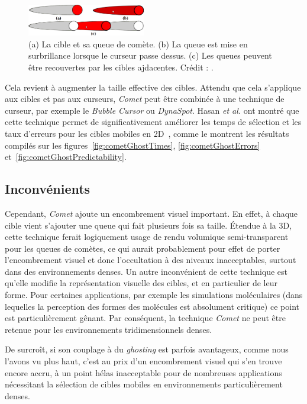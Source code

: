 	\begin{figure} %
		\centering
		\includegraphics[width=0.46\textwidth]{figures/ch2/comet}
		\caption[La technique \emph{Comet}]{(a) La cible et sa queue de comète. (b) La queue est mise en surbrillance lorsque le curseur passe dessus. (c) Les queues peuvent être recouvertes par les cibles ajdacentes. Crédit : \cite{hasan2011comet}.}
		\label{fig:comet}
	\end{figure}
	
	Cela revient à augmenter la taille effective des cibles. Attendu que cela s'applique aux cibles et pas aux curseurs, \emph{Comet} peut être combinée à une technique de curseur, par exemple le \emph{Bubble Cursor} ou \emph{DynaSpot}. Hasan \emph{et al.} ont montré que cette technique permet de significativement améliorer les temps de sélection et les taux d'erreurs pour les cibles mobiles en 2D~\cite{hasan2011comet}, comme le montrent les résultats compilés sur les figures~\ref{fig:cometGhostTimes}, \ref{fig:cometGhostErrors} et~\ref{fig:cometGhostPredictability}.

	\subsection{Inconvénients}
	Cependant, \emph{Comet} ajoute un \og encombrement \fg{} visuel important. En effet, à chaque cible vient s'ajouter une queue qui fait plusieurs fois sa taille. Étendue à la 3D, cette technique ferait logiquement usage de rendu volumique semi-transparent pour les queues de comètes, ce qui aurait probablement pour effet de porter l'encombrement visuel et donc l'occultation à des niveaux inacceptables, surtout dans des environnements denses. Un autre inconvénient de cette technique est qu'elle modifie la représentation visuelle des cibles, et en particulier de leur forme. Pour certaines applications, par exemple les simulations moléculaires (dans lequelles la perception des formes des molécules est absolument critique) ce point est particulièrement gênant. Par conséquent, la technique \emph{Comet} ne peut être retenue pour les environnements tridimensionnels denses.

	De surcroît, si son couplage à du \emph{ghosting} est parfois avantageux, comme nous l'avons vu plus haut, c'est au prix d'un encombrement visuel qui s'en trouve encore accru, à un point hélas inacceptable pour de nombreuses applications nécessitant la sélection de cibles mobiles en environnements particulièrement denses.

